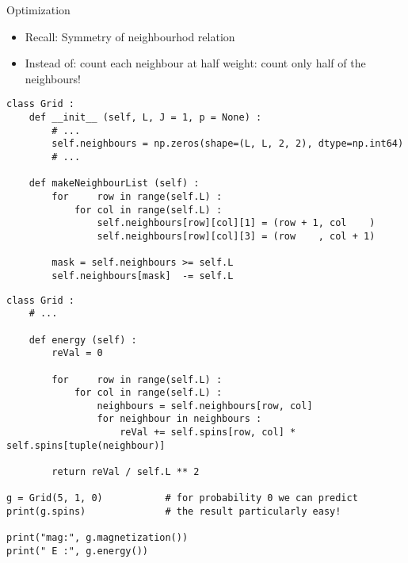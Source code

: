 
\begin{frame}[fragile]{Optimization}
%
\begin{itemize}
\item Recall: Symmetry of neighbourhod relation
\item Instead of: count each neighbour at half weight: count only half of the neighbours!
\end{itemize}
%
\vspace{-6pt}
\begin{codebox}
\begin{verbatim}
class Grid :
    def __init__ (self, L, J = 1, p = None) :
        # ...
        self.neighbours = np.zeros(shape=(L, L, 2, 2), dtype=np.int64)
        # ...
    
    def makeNeighbourList (self) :
        for     row in range(self.L) :
            for col in range(self.L) :
                self.neighbours[row][col][1] = (row + 1, col    )
                self.neighbours[row][col][3] = (row    , col + 1)
                
        mask = self.neighbours >= self.L
        self.neighbours[mask]  -= self.L
\end{verbatim}
\end{codebox}
%
\end{frame}


\begin{frame}[fragile]
%
\begin{codebox}
\begin{verbatim}
class Grid :
    # ...
    
    def energy (self) :
        reVal = 0
        
        for     row in range(self.L) :
            for col in range(self.L) :
                neighbours = self.neighbours[row, col]
                for neighbour in neighbours :
                    reVal += self.spins[row, col] * self.spins[tuple(neighbour)]
        
        return reVal / self.L ** 2

g = Grid(5, 1, 0)           # for probability 0 we can predict
print(g.spins)              # the result particularly easy!

print("mag:", g.magnetization())
print(" E :", g.energy())
\end{verbatim}
\end{codebox}
%
\end{frame}

